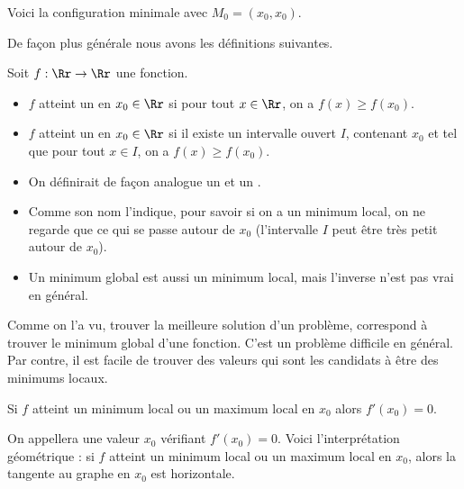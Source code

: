 \documentclass[11pt,class=report,crop=false]{standalone}
\begin{document}
Voici la configuration minimale avec $M_0 = (x_0,x_0)$.

\bigskip



De façon plus générale nous avons les définitions suivantes.
\begin{definition}
Soit $f : \Rr \to \Rr$ une fonction.
\begin{itemize}
  \item $f$ atteint un  en $x_0 \in \Rr$ si
  pour tout $x \in \Rr$, on a $f(x) \ge f(x_0)$.
  
  \item$f$ atteint un  en $x_0 \in \Rr$ si
  il existe un intervalle ouvert $I$, contenant $x_0$ et tel que 
  pour tout $x \in I$, on a $f(x) \ge f(x_0)$. 
\end{itemize}
\end{definition}




\begin{itemize}
  \item On définirait de façon analogue un  et un .
  \item Comme son nom l'indique, pour savoir si on a un minimum local, on ne regarde que ce qui se passe autour de $x_0$ (l'intervalle $I$ peut être très petit autour de $x_0$).
  \item Un minimum global est aussi un minimum local, mais l'inverse n'est pas vrai en général.
\end{itemize}

\bigskip

Comme on l'a vu, trouver la meilleure solution d'un problème, correspond à trouver le minimum global d'une fonction. C'est un problème difficile en général. Par contre, il est facile de trouver des valeurs qui sont les candidats à être des minimums locaux.

\begin{proposition}
Si $f$ atteint un minimum local ou un maximum local en $x_0$ alors $f'(x_0) = 0$.
\end{proposition}

On appellera  une valeur $x_0$ vérifiant $f'(x_0)=0$.
Voici l'interprétation géométrique : si $f$ atteint un minimum local ou un maximum local en $x_0$, alors la tangente au graphe en $x_0$ est horizontale.
\end{document}
